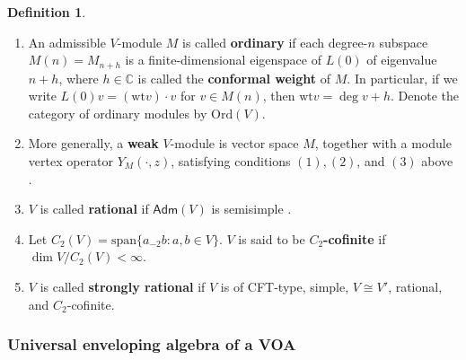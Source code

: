 \documentclass[12pt,a4paper,reqno]{amsart}
\numberwithin{equation}{section}
\numberwithin{equation}{section}
\theoremstyle{definition}
\newtheorem{df}[thm]{Definition}
\newcommand{\Z}{\mathbb{Z}}
\def \C {\mathbb{C}}
\def\Id{\mathrm{Id}}
\def \wt {\mathrm{wt}}
\def\spn{\mathrm{span}}
\def\<{\langle}
\def\>{\rangle}
\def\adm{\mathsf{Adm}}
\def\Ord{\mathrm{Ord}}
\begin{document}
\begin{df}
	\begin{enumerate}
		\item 	An admissible $V$-module $M$ is called {\bf ordinary} if each degree-$n$ subspace $M(n)=M_{n+h}$ is a finite-dimensional eigenspace of $L(0)$ of eigenvalue $n+h$, where $h\in \C$ is called the {\bf conformal weight} of $M$. In particular, if we write $L(0)v=(\wt v)\cdot v$ for $v\in M(n)$, then $\wt v=\deg v+h$. Denote the category of ordinary modules by $\Ord(V)$. 
		\item 	More generally, a {\bf weak} $V$-module is vector space $M$, together with a module vertex operator $Y_M(\cdot,z)$, satisfying conditions $(1),(2)$, and $(3)$ above \cite{DLM1}. 
		\item 	$V$ is called {\bf rational} if $\adm(V)$ is semisimple \cite{Z,DLM1}.
		\item Let $C_2(V)=\spn\{ a_{-2}b:a,b\in V\}$. $V$ is said to be {\bf $C_2$-cofinite} if $\dim V/C_2(V)<\infty$. 
		\item $V$ is called {\bf strongly rational} if $V$ is of CFT-type, simple, $V\cong V'$, rational, and $C_2$-cofinite. 
	\end{enumerate}
\end{df}




\subsubsection{Universal enveloping algebra of a VOA}
\end{document}
